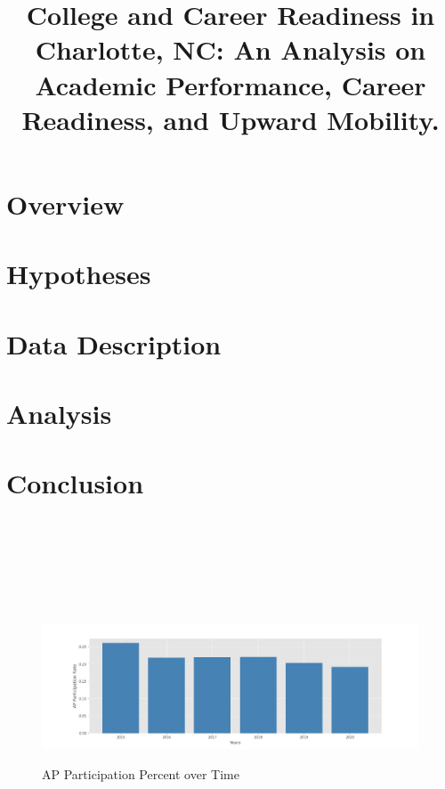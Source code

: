\documentclass[stu, 12pt, longtable]{apa7}
\title{College and Career Readiness in Charlotte, NC: An Analysis on Academic Performance, Career Readiness, and Upward Mobility.}
\begin{document}
\maketitle

\section{Overview}


\section{Hypotheses}


\section{Data Description}


\section{Analysis}


\section{Conclusion}



\printbibliography

\appendix
\section{}


\\


\\


\\



\section{}
\begin{figure}
    \caption{AP Participation Percent over Time}
    \includegraphics[width=17cm]{AP Participation Rate.png}
    \label{fig1}
\end{figure}
\end{document}

